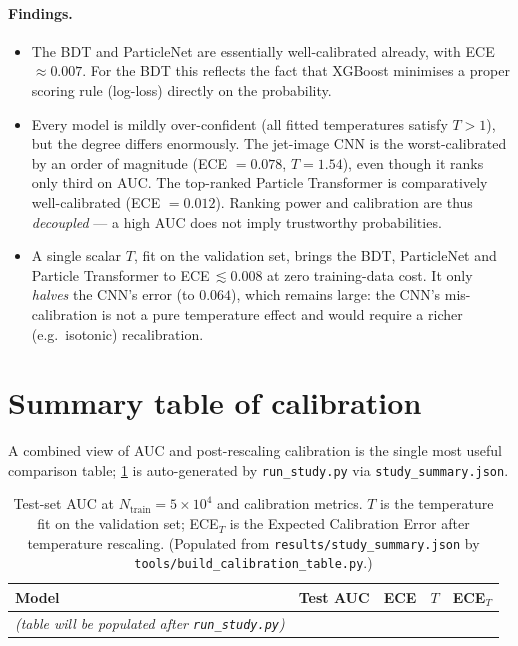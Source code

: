 \documentclass[12pt,a4paper,oneside]{report}
\begin{document}
\paragraph{Findings.}
\begin{itemize}
    \item The BDT and ParticleNet are essentially well-calibrated
          already, with ECE $\approx0.007$.  For the BDT this
          reflects the fact that XGBoost minimises a proper scoring
          rule (log-loss) directly on the probability.
    \item Every model is mildly over-confident (all fitted
          temperatures satisfy $T>1$), but the degree differs
          enormously.  The jet-image CNN is the worst-calibrated by
          an order of magnitude (ECE $=0.078$, $T=1.54$), even though
          it ranks only third on AUC.  The top-ranked Particle
          Transformer is comparatively well-calibrated
          (ECE $=0.012$).  Ranking power and calibration are thus
          \emph{decoupled} --- a high AUC does not imply trustworthy
          probabilities.
    \item A single scalar $T$, fit on the validation set, brings the
          BDT, ParticleNet and Particle Transformer to
          ECE\,$\lesssim\!0.008$ at zero training-data cost.  It only
          \emph{halves} the CNN's error (to $0.064$), which remains
          large: the CNN's mis-calibration is not a pure temperature
          effect and would require a richer (e.g.\ isotonic)
          recalibration.
\end{itemize}

\section{Summary table of calibration}
A combined view of AUC and post-rescaling calibration is the
single most useful comparison table; \cref{tab:calibration} is
auto-generated by \texttt{run\_study.py} via
\texttt{study\_summary.json}.

\begin{table}[ht!]
\centering
\caption{Test-set AUC at $N_{\text{train}}=5\!\times\!10^4$ and
calibration metrics. $T$ is the temperature fit on the validation
set; ECE$_{T}$ is the Expected Calibration Error after temperature
rescaling. (Populated from \texttt{results/study\_summary.json} by
\texttt{tools/build\_calibration\_table.py}.)}
\label{tab:calibration}
  {}
  {%
    \begin{tabular}{lcccc}
    \toprule
    Model & Test AUC & ECE & $T$ & ECE$_{T}$ \\
    \midrule
    \emph{(table will be populated after \texttt{run\_study.py})} \\
    \bottomrule
    \end{tabular}
  }
\end{table}
\end{document}
